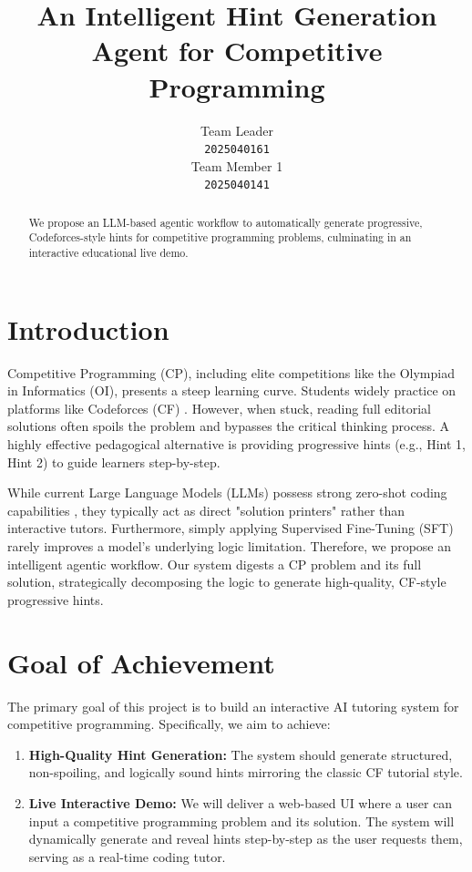 \documentclass{article}
\title{An Intelligent Hint Generation Agent for Competitive Programming}
\author{%
  Team Leader \\
  \texttt{2025040161} \\
  \And
  Team Member 1 \\
  \texttt{2025040141} \\
}
\begin{document}
\maketitle

\begin{abstract}
  We propose an LLM-based agentic workflow to automatically generate progressive, Codeforces-style hints for competitive programming problems, culminating in an interactive educational live demo.
\end{abstract}

\section{Introduction}
Competitive Programming (CP), including elite competitions like the Olympiad in Informatics (OI), presents a steep learning curve. Students widely practice on platforms like Codeforces (CF) \cite{codeforces}. However, when stuck, reading full editorial solutions often spoils the problem and bypasses the critical thinking process. A highly effective pedagogical alternative is providing progressive hints (e.g., Hint 1, Hint 2) to guide learners step-by-step.

While current Large Language Models (LLMs) possess strong zero-shot coding capabilities \cite{OpenCodeInterpreter}, they typically act as direct "solution printers" rather than interactive tutors. Furthermore, simply applying Supervised Fine-Tuning (SFT) rarely improves a model's underlying logic limitation. Therefore, we propose an intelligent agentic workflow. Our system digests a CP problem and its full solution, strategically decomposing the logic to generate high-quality, CF-style progressive hints.

\section{Goal of Achievement}
The primary goal of this project is to build an interactive AI tutoring system for competitive programming. Specifically, we aim to achieve:
\begin{enumerate}
    \item \textbf{High-Quality Hint Generation:} The system should generate structured, non-spoiling, and logically sound hints mirroring the classic CF tutorial style.
    \item \textbf{Live Interactive Demo:} We will deliver a web-based UI where a user can input a competitive programming problem and its solution. The system will dynamically generate and reveal hints step-by-step as the user requests them, serving as a real-time coding tutor.
\end{enumerate}
\end{document}
